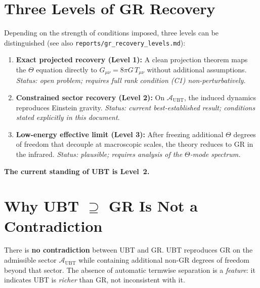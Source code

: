 \documentclass[12pt]{article}
\theoremstyle{definition}
\theoremstyle{remark}
\begin{document}
\section{Three Levels of GR Recovery}
\label{sec:three_levels}

Depending on the strength of conditions imposed, three levels can be
distinguished (see also \texttt{reports/gr\_recovery\_levels.md}):

\begin{enumerate}
  \item \textbf{Exact projected recovery (Level 1):} A clean projection theorem
    maps the $\Theta$ equation directly to $G_{\mu\nu} = 8\pi G\,T_{\mu\nu}$
    without additional assumptions.
    \emph{Status: open problem; requires full rank condition (C1) non-perturbatively.}

  \item \textbf{Constrained sector recovery (Level 2):} On $\mathcal{A}_{\mathrm{UBT}}$,
    the induced dynamics reproduces Einstein gravity.
    \emph{Status: current best-established result; conditions stated explicitly
    in this document.}

  \item \textbf{Low-energy effective limit (Level 3):} After freezing
    additional $\Theta$ degrees of freedom that decouple at macroscopic scales,
    the theory reduces to GR in the infrared.
    \emph{Status: plausible; requires analysis of the $\Theta$-mode spectrum.}
\end{enumerate}

\textbf{The current standing of UBT is Level~2.}

\section{Why UBT $\supseteq$ GR Is Not a Contradiction}
\label{sec:no_contradiction}

\begin{tcolorbox}[colback=green!8!white,colframe=green!60!black,
                  title=Consistency Statement]
There is \textbf{no contradiction} between UBT and GR.  UBT reproduces GR
on the admissible sector $\mathcal{A}_{\mathrm{UBT}}$ while containing
additional non-GR degrees of freedom beyond that sector.  The absence of
automatic termwise separation is a \emph{feature}: it indicates UBT is
\emph{richer} than GR, not inconsistent with it.
\end{tcolorbox}
\end{document}
